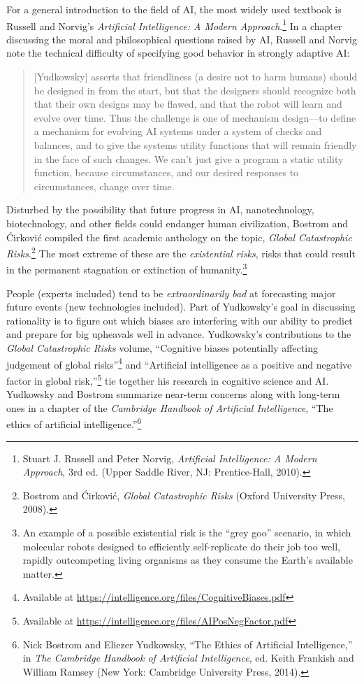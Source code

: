  For a general introduction to the field of AI, the most widely
used textbook is Russell and Norvig's
\textit{Artificial Intelligence: A Modern Approach}.\footnote{Stuart J. Russell and Peter Norvig, \textit{Artificial
Intelligence: A Modern Approach}, 3rd ed. (Upper Saddle River, NJ:
Prentice-Hall, 2010).}
In a chapter discussing the moral and philosophical questions raised by
AI, Russell and Norvig note the technical difficulty of specifying good
behavior in strongly adaptive AI:

\begin{quotation}
{
 [Yudkowsky] asserts that friendliness (a desire not to harm
humans) should be designed in from the start, but that the designers
should recognize both that their own designs may be flawed, and that
the robot will learn and evolve over time. Thus the challenge is one of
mechanism design---to define a mechanism for evolving AI systems under
a system of checks and balances, and to give the systems utility
functions that will remain friendly in the face of such changes. We
can't just give a program a static utility function,
because circumstances, and our desired responses to circumstances,
change over time.}
\end{quotation}

{
 Disturbed by the possibility that future progress in AI,
nanotechnology, biotechnology, and other fields could endanger human
civilization, Bostrom and \'Cirkovi\'c compiled the first academic
anthology on the topic, \textit{Global Catastrophic
Risks}.\footnote{Bostrom and \'Cirkovi\'c, \textit{Global Catastrophic Risks} (Oxford University Press, 2008).} The most extreme of these are the
\textit{existential risks}, risks that could result in the permanent
stagnation or extinction of humanity.\footnote{An example of a possible existential risk is the
``grey goo'' scenario, in which
molecular robots designed to efficiently self-replicate do their job
too well, rapidly outcompeting living organisms as they consume the
Earth's available matter.}}

{
 People (experts included) tend to be \textit{extraordinarily bad}
at forecasting major future events (new technologies included). Part of
Yudkowsky's goal in discussing rationality is to figure
out which biases are interfering with our ability to predict and
prepare for big upheavals well in advance. Yudkowsky's
contributions to the \textit{Global Catastrophic Risks} volume,
``Cognitive biases potentially affecting judgement of
global risks''\footnote{Available at \url{https://intelligence.org/files/CognitiveBiases.pdf}} and ``Artificial
intelligence as a positive and negative factor in global
risk,''\footnote{Available at \url{https://intelligence.org/files/AIPosNegFactor.pdf}} tie together his research in cognitive
science and AI. Yudkowsky and Bostrom summarize near-term concerns
along with long-term ones in a chapter of the \textit{Cambridge
Handbook of Artificial Intelligence}, ``The ethics of
artificial intelligence.''\footnote{Nick Bostrom and Eliezer Yudkowsky, ``The
Ethics of Artificial Intelligence,'' in \textit{The
Cambridge Handbook of Artificial Intelligence}, ed. Keith Frankish and
William Ramsey (New York: Cambridge University Press, 2014).}}


